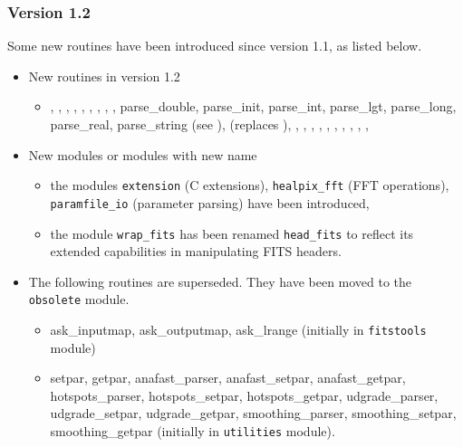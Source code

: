 \documentclass[12pt,twoside]{article}
\newcommand{\compresslist}{%
\setlength{\itemsep}{0ex}}{}
\begin{document}
{\subsubsection*{Version 1.2}
Some new routines have been introduced since version 1.1, as listed below.

\begin{itemize}\compresslist
\item New routines in version 1.2
\begin{itemize}\compresslist
\item {}, 
, 
, 
, 
, 
, 
, 
, 
, 
parse\_double, parse\_init, parse\_int, parse\_lgt, parse\_long, parse\_real, parse\_string (see ), 
 (replaces ), 
, 
, 
, 
, 
, 
, 
, 
, 
, 
, 
\end{itemize}

\item New modules or modules with new name
\begin{itemize}\compresslist
\item the modules {\tt extension} (C extensions), {\tt healpix\_fft} (FFT
operations), {\tt paramfile\_io} (parameter parsing) have
been introduced,
\item the module {\tt wrap\_fits} has been renamed {\tt head\_fits} to
reflect its extended capabilities in manipulating FITS headers.
\end{itemize}

\item The following routines are superseded. They have been moved to the
{\tt obsolete} module.
\begin{itemize}\compresslist
\item ask\_inputmap, ask\_outputmap, ask\_lrange (initially in {\tt fitstools} module)
\item setpar, getpar, anafast\_parser, anafast\_setpar, anafast\_getpar,
hotspots\_parser, hotspots\_setpar, hotspots\_getpar, udgrade\_parser,
udgrade\_setpar, udgrade\_getpar, smoothing\_parser, smoothing\_setpar,
smoothing\_getpar (initially in {\tt utilities} module).
\end{itemize}


\end{itemize}}
\end{document}
